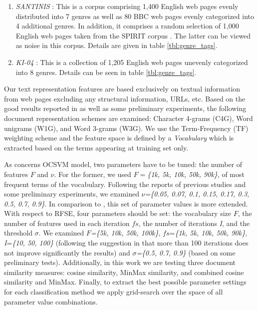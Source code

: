 \begin{enumerate}
\item \textit{SANTINIS} \citep{mehler2010genres_on_web}: This is a corpus comprising 1,400 English web pages evenly distributed into 7 genres as well as 80 BBC web pages evenly categorized into 4 additional genres. In addition, it comprises a random selection of 1,000 English web pages taken from the SPIRIT corpus \citep{joho2004spirit}. The latter can be viewed as noise in this corpus. Details are given in table \ref{tbl:genre_tags}.
\item \textit{KI-04} \citep{meyer2004genre}: This is a collection of 1,205 English web pages unevenly categorized into 8 genres. Details can be seen in table \ref{tbl:genre_tags}.
\end{enumerate}


Our text representation features are based exclusively on textual information from web pages excluding any structural information, URLs, etc. Based on the good results reported in \citep{sharoff2010web,pritsos2013open,Asheghi2015} as well as some preliminary experiments, the following document representation schemes are examined: Character 4-grams (C4G), Word unigrams (W1G), and Word 3-grams (W3G). We use the Term-Frequency (TF) weighting scheme  and the feature space is defined by a \textit{Vocabulary} which is extracted based on the terms appearing at training set only.

As concerns OCSVM model, two parameters have to be tuned: the number of features $F$ and $\nu$. For the former, we used $F=$\textit{\{1k, 5k, 10k, 50k, 90k\}}, of most frequent terms of the vocabulary. Following the reports of previous studies \citep{scholkopf1999estimating} and some preliminary experiments, we examined $\nu$\textit{=\{0.05, 0.07, 0.1, 0.15, 0.17, 0.3, 0.5, 0.7, 0.9\}}. In comparison to \citep{pritsos2013open}, this set of parameter values is more extended. With respect to RFSE, four parameters should be set: the vocabulary size $F$, the number of features used in each iteration $fs$, the number of iterations \textit{I}, and the threshold $\sigma$. We examined $F$\textit{=\{5k, 10k, 50k, 100k\}}, $fs$=\textit{\{1k, 5k, 10k, 50k, 90k\}}, \textit{I}=\textit{\{10, 50, 100\}} (following the suggestion in \citep{koppel2011authorship} that more than 100 iterations does not improve significantly the results) and $\sigma$\textit{=\{0.5, 0.7, 0.9\}} (based on some preliminary tests). Additionally, in this work we are testing three document similarity measures: cosine similarity, MinMax similarity,  and combined cosine similarity and MinMax. Finally, to extract the best possible parameter settings for each classification method we apply grid-search over the space of all parameter value combinations.

